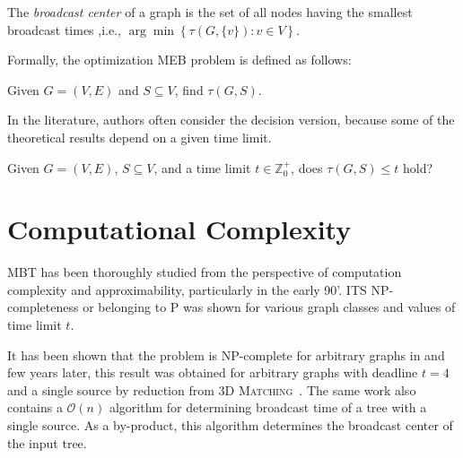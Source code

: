 The \emph{broadcast center} of a graph is the set of all nodes having the smallest broadcast times ,i.e., $\arg\min\left\{\tau(G,\{v\}):v\in V\right\}$.

Formally, the optimization MEB problem is defined as follows:
\begin{problem}\label{mbt:opt}
Given $G=(V,E)$ and $S\subseteq V$, find $\tau(G,S)$. 
\end{problem}

In the literature, authors often consider the decision version, because some of the theoretical results depend on a given time limit.
\begin{problem}\label{mbt:dec}
Given $G=(V,E)$, $S\subseteq V$,  and a time limit $t\in \mathbb{Z}^+_0$, does $\tau(G,S)\leq t$ hold? 
\end{problem}


\section{Computational Complexity}

MBT has been thoroughly studied from the perspective of computation complexity and approximability, particularly in the early 90'.
ITS NP-completeness or belonging to P was shown for various graph classes and values of time limit $t$.

It has been shown that the problem is NP-complete for arbitrary graphs in \cite{garey79} and few years later, 
this result was obtained for arbitrary graphs with deadline $t=4$ and a single source by reduction from \textsc{3D Matching}~\cite{slater81}. 
The same work also contains a $\mathcal{O}(n)$ algorithm for determining broadcast time of a tree with a single source. 
As a by-product, this algorithm determines the broadcast center of the input tree.

